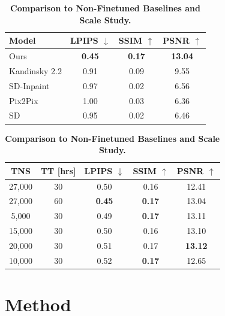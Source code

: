 \documentclass[11pt,twocolumn]{article}
\begin{document}
\begin{table}[t]
  \centering
  \begin{subtable}[t]{0.48\textwidth}
    \vspace{0pt}
    \centering
    \begin{tabular}{l|ccc}
      \toprule
      \textbf{Model} & \textbf{LPIPS} $\downarrow$ & \textbf{SSIM} $\uparrow$ & \textbf{PSNR} $\uparrow$ \\
      \midrule
      Ours         & \textbf{0.45} & \textbf{0.17} & \textbf{13.04} \\
      Kandinsky 2.2 & 0.91 & 0.09 & 9.55 \\
      SD-Inpaint   & 0.97 & 0.02 & 6.56 \\
      Pix2Pix      & 1.00 & 0.03 & 6.36 \\
      SD           & 0.95 & 0.02 & 6.46 \\
      \bottomrule
    \end{tabular}
    \label{tab:best-vs-baseline}
  \end{subtable}
  \hfill
  \begin{subtable}[t]{0.48\textwidth}
    \vspace{0pt}
    \centering
    \begin{tabular}{cc|ccc}
      \toprule
      \textbf{TNS} & \textbf{TT [hrs]} & \textbf{LPIPS} $\downarrow$ & \textbf{SSIM} $\uparrow$ & \textbf{PSNR} $\uparrow$ \\
      \midrule
      27,000 & 30 & 0.50 & 0.16 & 12.41 \\
      \midrule
      27,000 & 60 & \textbf{0.45} & \textbf{0.17} & 13.04 \\
      5,000  & 30 & 0.49 & \textbf{0.17} & 13.11 \\
      15,000 & 30 & 0.50 & 0.16 & 13.10 \\
      20,000 & 30 & 0.51 & 0.17 & \textbf{13.12} \\
      10,000 & 30 & 0.52 & \textbf{0.17} & 12.65 \\
      \bottomrule
    \end{tabular}
    \label{tab:scale-study}
  \end{subtable}
  \caption{\textbf{Comparison to Non-Finetuned Baselines and Scale Study.}}
\end{table}
\section{Method}
\end{document}
